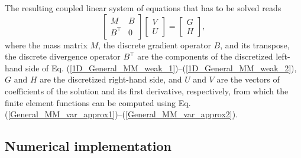 \documentclass[final,3p]{elsarticle}
\begin{document}
The resulting coupled linear system of equations that has to be solved reads
\begin{equation}
 \left[ \begin{array}{cc} M & B  \\ B^\top & 0 \end{array}\right] \left[ \begin{array}{cc} {V} \\ {U} \end{array}\right] =\left[ \begin{array}{cc} G \\ H \end{array}\right],		\label{matrix system mixed}
\end{equation}
where the mass matrix $M$, the discrete gradient operator $B$, and its transpose, the discrete divergence operator $B^\top$ are the components of the discretized left-hand side of Eq. (\ref{1D_General_MM_weak_1})--(\ref{1D_General_MM_weak_2}), $G$ and $H$ are the discretized right-hand side, and $U$ and $V$ are the vectors of coefficients of the solution and its first derivative, respectively, from which the finite element functions can be computed using Eq. (\ref{General_MM_var_approx1})--(\ref{General_MM_var_approx2}).


\subsection{Numerical implementation}
\end{document}
